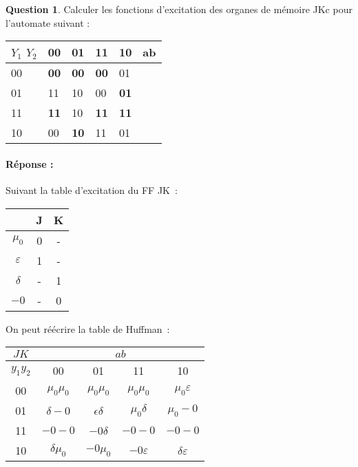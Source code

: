 \documentclass[11pt,a4paper]{article}
\theoremstyle{definition}%
\newtheorem{Q}{Question}[] %
\newcommand{\reponse}[1]{%
	\ifthenelse {\boolean{corrige}} {\paragraph{Réponse :} \color{darkblue}   #1\color{black}} {}
 }
\begin{document}
\begin{Q}
Calculer les fonctions d'excitation des organes de mémoire JKc pour l'automate suivant :


\begin{center}
	\begin{tabular}{|l|l|l|l|l|l}
	\hline
	$Y_1$ $Y_2$ & 00         & 01         & 11         & 10         & \multicolumn{1}{l|}{ab} \\ \hline
	00           & \textbf{00} & \textbf{00} & \textbf{00} & 01          &                         \\ \cline{1-5}
	01           & 11          & 10          & 00          & \textbf{01} &                         \\ \cline{1-5}
	11           & \textbf{11} & 10          & \textbf{11} & \textbf{11} &                         \\ \cline{1-5}
	10           & 00          & \textbf{10} & 11          & 01          &                         \\ \cline{1-5}
	\end{tabular}
\end{center}


\reponse{
	Suivant la table d'excitation du FF JK~:
	\begin{center}
		\begin{tabular}{c|cc}
			& J & K \\ \hline
			$\mu_0$ & 0 & - \\
			$\varepsilon$ & 1 & - \\
			$\delta$ & - & 1 \\
			$-0$ & - & 0
		\end{tabular}
	\end{center}

	On peut réécrire la table de Huffman~:
	\begin{center}
		\begin{tabular}{|c|c|c|c|c|}\hline
		$JK$ & \multicolumn{4}{c|}{$ab$} \\ \hline
		$y_1y_2$ & 00 & 01 & 11 & 10 \\ \hline
		00 & $\mu_0\mu_0$ & $\mu_0\mu_0$ & $\mu_0\mu_0$ & $\mu_0\varepsilon$ \\ \hline
		01 & $\delta-0$ & $\epsilon\delta$ & $\mu_0\delta$ & $\mu_0-0$ \\ \hline
		11 & $-0-0$ & $-0\delta$ & $-0-0$ & $-0-0$ \\ \hline
		10 & $\delta\mu_0$ & $-0\mu_0$ & $-0\varepsilon$ & $\delta\varepsilon$ \\ \hline
		\end{tabular}
	\end{center}

}
\end{Q}
\end{document}
